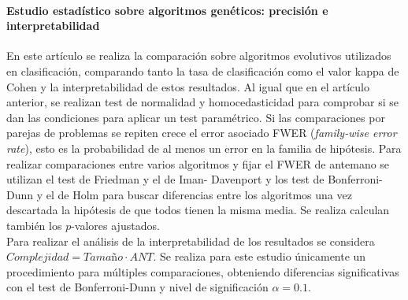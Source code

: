 	\paragraph{Estudio estadístico sobre algoritmos 
genéticos: precisión e interpretabilidad} \cite{GARCIA08} En 
este artículo se realiza la comparación sobre algoritmos 
evolutivos utilizados en clasificación, comparando tanto la 
tasa de clasificación como el valor kappa de Cohen y la 
interpretabilidad de estos resultados. Al igual que en el 
artículo anterior, se realizan test de normalidad y 
homocedasticidad para comprobar si se dan las condiciones 
para aplicar un test paramétrico. Si las comparaciones por 
parejas de problemas se repiten crece el error asociado FWER 
(\textit{family-wise error rate}), esto es la probabilidad de 
al menos un error en la familia de hipótesis. Para realizar 
comparaciones entre varios algoritmos y fijar el FWER de 
antemano se utilizan el test de Friedman y el de Iman-
Davenport y los test de Bonferroni-Dunn y el de Holm para 
buscar diferencias entre los algoritmos una vez descartada la 
hipótesis de que todos tienen la misma media. Se realiza 
calculan también los $p$-valores ajustados.\\
	Para realizar el análisis de la interpretabilidad de los 
resultados se considera $\textit{Complejidad} = 
\textit{Tamaño} \cdot ANT$. Se realiza para este estudio 
únicamente un procedimiento para múltiples comparaciones, 
obteniendo diferencias significativas con el test de 
Bonferroni-Dunn y nivel de significación $\alpha=0.1$.
	
